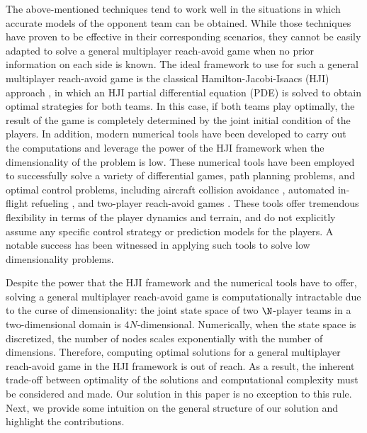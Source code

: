 The above-mentioned techniques tend to work well in the situations in which accurate models of the opponent team can be obtained. While those techniques have proven to be effective in their corresponding scenarios, they cannot be easily adapted to solve a general multiplayer reach-avoid game when no prior information on each side is known. The ideal framework to use for such a general multiplayer reach-avoid game is the classical Hamilton-Jacobi-Isaacs (HJI) approach \cite{b:isaacs-1967}, in which an HJI partial differential equation (PDE) is solved to obtain optimal strategies for both teams. In this case, if both teams play optimally, the result of the game is completely determined by the joint initial condition of the players. In addition, modern numerical tools \cite{j:mitchell-TAC-2005, Sethian1996, b:osher-fedkiw-2002} have been developed to carry out the computations and leverage the power of the HJI framework when the dimensionality of the problem is low. These numerical tools have been employed to successfully solve a variety of differential games, path planning problems, and optimal control problems, including aircraft collision avoidance \cite{j:mitchell-TAC-2005}, automated in-flight refueling \cite{DSST08}, and two-player reach-avoid games \cite{Huang2011}. These tools offer tremendous flexibility in terms of the player dynamics and terrain, and do not explicitly assume any specific control strategy or prediction models for the players. A notable success \cite{j:mitchell-TAC-2005} has been witnessed in applying such tools to solve low dimensionality problems.

Despite the power that the HJI framework and the numerical tools have to offer, solving a general multiplayer reach-avoid game is computationally intractable due to the curse of dimensionality: the joint state space of two $\N$-player teams in a two-dimensional domain is $4N$-dimensional. Numerically, when the state space is discretized, the number of nodes scales exponentially with the number of dimensions. Therefore, computing optimal solutions for a general multiplayer reach-avoid game in the HJI framework is out of reach. As a result, the inherent trade-off between optimality of the solutions and computational complexity must be considered and made. Our solution in this paper is no exception to this rule. Next, we provide some intuition on the general structure of our solution and highlight the contributions.   

